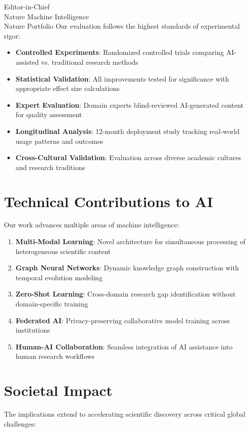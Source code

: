 \documentclass[11pt]{letter}
\begin{document}
\begin{letter}{Editor-in-Chief\\
Nature Machine Intelligence\\
Nature Portfolio}
Our evaluation follows the highest standards of experimental rigor:

\begin{itemize}
    \item \textbf{Controlled Experiments}: Randomized controlled trials comparing AI-assisted vs. traditional research methods
    \item \textbf{Statistical Validation}: All improvements tested for significance with appropriate effect size calculations
    \item \textbf{Expert Evaluation}: Domain experts blind-reviewed AI-generated content for quality assessment
    \item \textbf{Longitudinal Analysis}: 12-month deployment study tracking real-world usage patterns and outcomes
    \item \textbf{Cross-Cultural Validation}: Evaluation across diverse academic cultures and research traditions
\end{itemize}

\section*{Technical Contributions to AI}

Our work advances multiple areas of machine intelligence:

\begin{enumerate}
    \item \textbf{Multi-Modal Learning}: Novel architecture for simultaneous processing of heterogeneous scientific content
    \item \textbf{Graph Neural Networks}: Dynamic knowledge graph construction with temporal evolution modeling
    \item \textbf{Zero-Shot Learning}: Cross-domain research gap identification without domain-specific training
    \item \textbf{Federated AI}: Privacy-preserving collaborative model training across institutions
    \item \textbf{Human-AI Collaboration}: Seamless integration of AI assistance into human research workflows
\end{enumerate}

\section*{Societal Impact}

The implications extend to accelerating scientific discovery across critical global challenges:


\end{letter}
\end{document}
